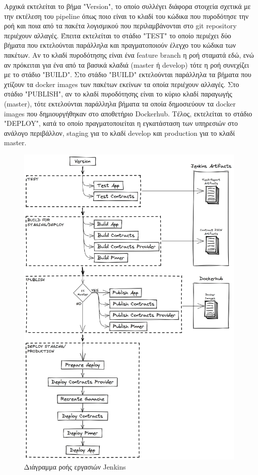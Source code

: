 Αρχικά εκτελείται το βήμα "Version", το οποίο συλλέγει διάφορα στοιχεία σχετικά με την εκτέλεση του pipeline όπως ποιο είναι το κλαδί του κώδικα που πυροδότησε την ροή και ποια από τα πακέτα λογισμικού που περιλαμβάνονται στο git repository περιέχουν αλλαγές. Έπειτα εκτελείται το στάδιο "TEST" το οποίο περιέχει δύο βήματα που εκτελούνται παράλληλα και πραγματοποιούν έλεγχο του κώδικα των πακέτων. Αν το κλαδί πυροδότησης είναι ένα feature branch η ροή σταματά εδώ, ενώ αν πρόκειται για ένα από τα βασικά κλαδιά (master ή develop) τότε η ροή συνεχίζει με το στάδιο "BUILD". Στο στάδιο "BUILD" εκτελούνται παράλληλα τα βήματα που χτίζουν τα docker images των πακέτων εκείνων τα οποία περιέχουν αλλαγές. Στο στάδιο "PUBLISH", αν το κλαδί πυροδότησης είναι το κύριο κλαδί παραγωγής (master), τότε εκτελούνται παράλληλα βήματα τα οποία δημοσιεύουν τα docker images που δημιουργήθηκαν στο αποθετήριο Dockerhub. Τέλος, εκτελείται το στάδιο "DEPLOY", κατά το οποίο πραγματοποιείται η εγκατάσταση των υπηρεσιών στο ανάλογο περιβάλλον, staging για το κλαδί develop και production για το κλαδί master.

\begin{figure}[H]
    \centering
    \includegraphics[width=.8\textwidth]{assets/figures/chapter-4/4-2-implementation-methodology-jenkins-pipeline.png}
    \caption{Διάγραμμα ροής εργασιών Jenkins}
    \label{figure:4.2.implementation-methodology-jenkins-pipeline}
\end{figure}
